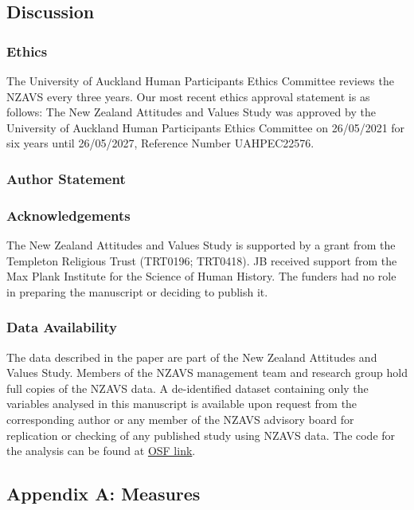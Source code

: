\documentclass[
  single column]{article}
\begin{document}
\subsection{Discussion}\label{discussion}

\subsubsection{Ethics}\label{ethics}

The University of Auckland Human Participants Ethics Committee reviews
the NZAVS every three years. Our most recent ethics approval statement
is as follows: The New Zealand Attitudes and Values Study was approved
by the University of Auckland Human Participants Ethics Committee on
26/05/2021 for six years until 26/05/2027, Reference Number UAHPEC22576.

\subsubsection{Author Statement}\label{author-statement}

\subsubsection{Acknowledgements}\label{acknowledgements}

The New Zealand Attitudes and Values Study is supported by a grant from
the Templeton Religious Trust (TRT0196; TRT0418). JB received support
from the Max Plank Institute for the Science of Human History. The
funders had no role in preparing the manuscript or deciding to publish
it.

\subsubsection{Data Availability}\label{data-availability}

The data described in the paper are part of the New Zealand Attitudes
and Values Study. Members of the NZAVS management team and research
group hold full copies of the NZAVS data. A de-identified dataset
containing only the variables analysed in this manuscript is available
upon request from the corresponding author or any member of the NZAVS
advisory board for replication or checking of any published study using
NZAVS data. The code for the analysis can be found at
\href{https://osf.io/ab7cx/}{OSF link}.

\newpage{}

\subsection{Appendix A: Measures}\label{appendix-measures}
\end{document}
